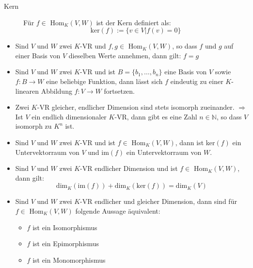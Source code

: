 \begin{description}
	\item [Kern] Für $f \in $ Hom$_K(V, W)$ ist der Kern definiert als:
	\begin{equation*}
		\mbox{ker}(f) := \{v \in V | f(v) = 0\}
	\end{equation*}
\end{description}
\begin{itemize}\itemsep0em
	\item Sind $V$ und $W$ zwei $K$-VR und $f, g \in $ Hom$_K(V, W)$, so dass $f$ und $g$ auf einer Basis von $V$ dieselben Werte annehmen, dann gilt: $f = g$
	\item Sind $V$ und $W$ zwei $K$-VR und ist $B = \{b_1, \dots, b_n\}$ eine Basis von $V$ sowie $f: B \rightarrow W$ eine beliebige Funktion, dann lässt sich $f$ eindeutig zu einer $K$-linearen Abbildung $f: V \rightarrow W$ fortsetzen.
	\item Zwei $K$-VR gleicher, endlicher Dimension sind stets isomorph zueinander. $\Rightarrow$ Ist $V$ ein endlich dimensionaler $K$-VR, dann gibt es eine Zahl $n \in \mathbb{N}$, so dass $V$ isomorph zu $K^n$ ist.
	\item Sind $V$ und $W$ zwei $K$-VR und ist $f \in$ Hom$_K(V, W)$, dann ist ker$(f)$ ein Untervektorraum von $V$ und im$(f)$ ein Untervektorraum von $W$.
	\item Sind $V$ und $W$ zwei $K$-VR endlicher Dimension und ist $f \in$ Hom$_K(V, W)$, dann gilt:
	\begin{equation*}
		\mbox{dim}_K(\mbox{im}(f)) + \mbox{dim}_K(\mbox{ker}(f)) = \mbox{dim}_K(V)
	\end{equation*}
	\item Sind $V$ und $W$ zwei $K$-VR endlicher und gleicher Dimension, dann sind für $f \in$ Hom$_K(V, W)$ folgende Aussage äquivalent:
	\begin{itemize}
		\item $f$ ist ein Isomorphismus
		\item $f$ ist ein Epimorphismus
		\item $f$ ist ein Monomorphismus
	\end{itemize}
\end{itemize}



